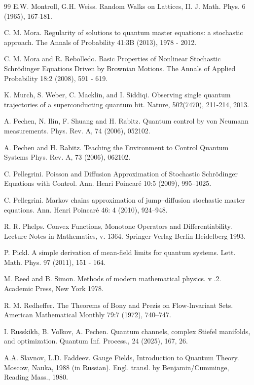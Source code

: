 \documentclass[12pt]{article}
\begin{document}
\begin{thebibliography}{99}
 E.W. Montroll, G.H. Weiss.
Random Walks on Lattices, II. J. Math. Phys. 6 (1965),
167-181.

C. M. Mora. Regularity of solutions to quantum master equations: a stochastic approach.
The Annals of Probability
41:3B (2013), 1978 - 2012.

C. M. Mora and R. Rebolledo.
Basic Properties of Nonlinear Stochastic Schrödinger Equations Driven by Brownian Motions.
 The Annals of Applied Probability 18:2 (2008), 591 - 619.

K. Murch, S. Weber, C. Macklin, and I. Siddiqi. Observing
single quantum trajectories of a superconducting
quantum bit. Nature, 502(7470), 211-214, 2013.

A. Pechen,  N. Il\'in, F. Shuang and H. Rabitz.
Quantum control by von Neumann measurements.
Phys. Rev. A, 74 (2006), 052102.

A. Pechen  and H. Rabitz.
Teaching the Environment to Control Quantum Systems
Phys. Rev. A, 73 (2006), 062102.

  C. Pellegrini.
Poisson and Diffusion Approximation of Stochastic Schr\"odinger Equations with Control.
 Ann. Henri Poincar\'e 10:5 (2009), 995–1025.

  C. Pellegrini.
Markov chains approximation of jump–diffusion stochastic
master equations.
 Ann. Henri Poincar\'e 46: 4 (2010), 924–948.

R. R. Phelps. Convex Functions, Monotone Operators and Differentiability.
Lecture Notes in Mathematics, v. 1364. Springer-Verlag Berlin Heidelberg 1993.

P. Pickl. A simple derivation of mean-field limits for quantum systems. Lett. Math. Phys. 97 (2011),
151 - 164.

 M. Reed and B. Simon.
Methods of modern mathematical physics. v .2. Academic Press, New York 1978.

 R. M. Redheffer. The Theorems of Bony and Prezis on Flow-Invariant Sets.
American Mathematical Monthly 79:7 (1972), 740--747.

I. Russkikh, B. Volkov, A. Pechen. Quantum channels, complex Stiefel manifolds, and optimization.
Quantum Inf. Process., 24 (2025), 167, 26.

 A.A. Slavnov, L.D. Faddeev. Gauge Fields, Introduction to Quantum Theory.
Moscow, Nauka, 1988 (in Russian). Engl. transl. by Benjamin/Cumminge,
Reading Mass., 1980.


\end{thebibliography}
\end{document}
